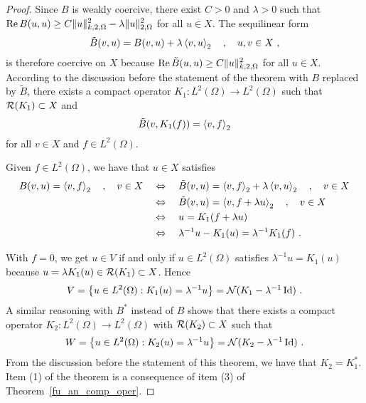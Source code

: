 \begin{proof}
Since $B$ is weakly coercive, there exist $C>0$ and $\lambda>0$ such
that $\displaystyle \operatorname{Re} B(u,u) \geq C \|u\|_{k,2,\Omega}^2
- \lambda \|u\|_{2,\Omega}^2$
for all $u \in X$.  The sequilinear form
\begin{equation} \label{ell_Bhat_sql}
\tilde{B}(v,u) = B(v,u) + \lambda\ps{v}{u}_2 \quad , \quad u,v \in X \ ,
\end{equation}
is therefore coercive on $X$ because
$\displaystyle \operatorname{Re} \tilde{B}(u,u) \geq C \|u\|_{k,2,\Omega}^2$
for all $u \in X$.  According to the discussion before the statement
of the theorem with $B$ replaced by $\tilde{B}$, there exists a
compact operator
$\displaystyle K_1:L^2(\Omega)\rightarrow L^2(\Omega)$ such that
$\mathcal{R}(K_1) \subset X$ and
\[
\tilde{B}(v,K_1(f)) = \left\langle{v} , {f}\right\rangle_2
\]
for all $v\in X$ and $\displaystyle f\in L^2(\Omega)$.

Given $\displaystyle f\in L^2(\Omega)$, we have that $u\in X$ satisfies
\begin{align}
B(v,u) = \left\langle{v} , {f}\right\rangle_2 \quad , \quad v\in X\quad &\Leftrightarrow \quad
\tilde{B}(v,u) = \left\langle{v} , {f}\right\rangle_2 + \lambda\left\langle{v} , {u}\right\rangle_2 \quad , \quad v \in X
\nonumber \\
&\Leftrightarrow \quad \tilde{B}(v,u) = \left\langle{v} , {f+\lambda u}\right\rangle_2 \quad ,
\quad v \in X \nonumber \\
&\Leftrightarrow \quad u = K_1(f+\lambda u) \nonumber \\
&\Leftrightarrow \quad \lambda^{-1} u - K_1(u) = \lambda^{-1} K_1(f) \ .
\label{ell_BK1u_K1f}
\end{align}

With $f=0$, we get $u\in V$ if and only if $\displaystyle u\in L^2(\Omega)$
satisfies $\lambda^{-1} u = K_1(u)$ because
$u = \lambda K_1(u) \in \mathcal{R}(K_1) \subset X$.
Hence
\[
V = \left\{ u \in L^2(\Omega) : K_1(u) = \lambda^{-1} u \right\} 
= \mathcal{N}(K_1-\lambda^{-1}\operatorname{Id}) \  .
\]
A similar reasoning with $\displaystyle B^\ast$ instead of $B$ shows that there
exists a compact operator
$\displaystyle K_2:L^2(\Omega) \rightarrow L^2(\Omega)$
with $\mathcal{R}(K_2) \subset X$ such that
\[
W = \left\{ u \in L^2(\Omega) : K_2(u) = \lambda^{-1} u \right\}
= \mathcal{N}(K_2-\lambda^{-1}\operatorname{Id}) \  .
\]
From the discussion before the statement of this theorem, we have that
$\displaystyle K_2= K_1^\ast$.  Item (1) of the theorem is a consequence of
item (3) of Theorem~\ref{fu_an_comp_oper}.


\end{proof}
